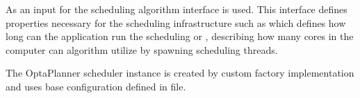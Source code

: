 As an input for the scheduling algorithm interface  is used.
This interface defines properties necessary for the scheduling infrastructure
such as  which defines how long can the application run the scheduling 
or , describing how many cores in the computer can algorithm utilize by spawning scheduling threads.

The OptaPlanner scheduler instance is created by custom factory implementation 
 and uses base configuration defined in  file.
